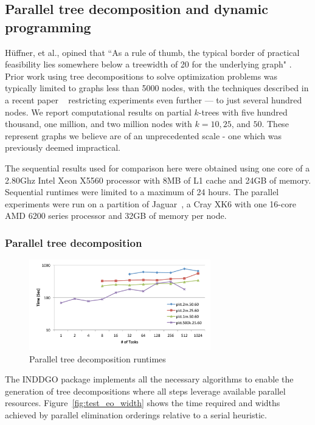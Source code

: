\documentclass[conference]{IEEEtran}
\begin{document}
\subsection{Parallel tree decomposition and dynamic programming}\label{sec:exp_td_dp}

H\"uffner, et al., opined that
``As a rule of thumb, the typical border
of practical feasibility lies somewhere below a treewidth of 20 for the underlying
graph" \cite{huffner}. Prior work using tree
decompositions to solve optimization problems was typically limited to graphs less than 5000 nodes,
with the techniques described in a recent paper ~\cite{cliquecover} restricting experiments even further --- to just several hundred nodes. We report computational results on partial $k$-trees with five hundred thousand, one
million, and two million nodes with $k = 10,25$, and $50$. These represent graphs we believe are of an unprecedented scale - one which was previously deemed impractical.

The sequential results used for comparison here were obtained using one core of a
2.80Ghz Intel Xeon X5560 %
processor with 8MB of L1 cache and 24GB of memory. Sequential runtimes were limited to a maximum of
24 hours. The parallel experiments were run on a partition of Jaguar~\cite{jaguar}, a Cray XK6 with one 16-core AMD 6200 series processor and 32GB of memory per node.

\subsubsection{Parallel tree decomposition}\label{sec:exp_td}

\begin{figure}[!ht]
\includegraphics[angle=0,width=3.1in]{figures/newfig8_col.pdf}
\caption{Parallel tree decomposition runtimes }
\label{fig:TDtimes}
\end{figure}

The INDDGO package implements all the necessary algorithms to
enable the generation of tree decompositions where all steps leverage available parallel resources. Figure~\ref{fig:test_eo_width} shows the time required and widths achieved by parallel elimination orderings relative to a serial heuristic.
\end{document}
